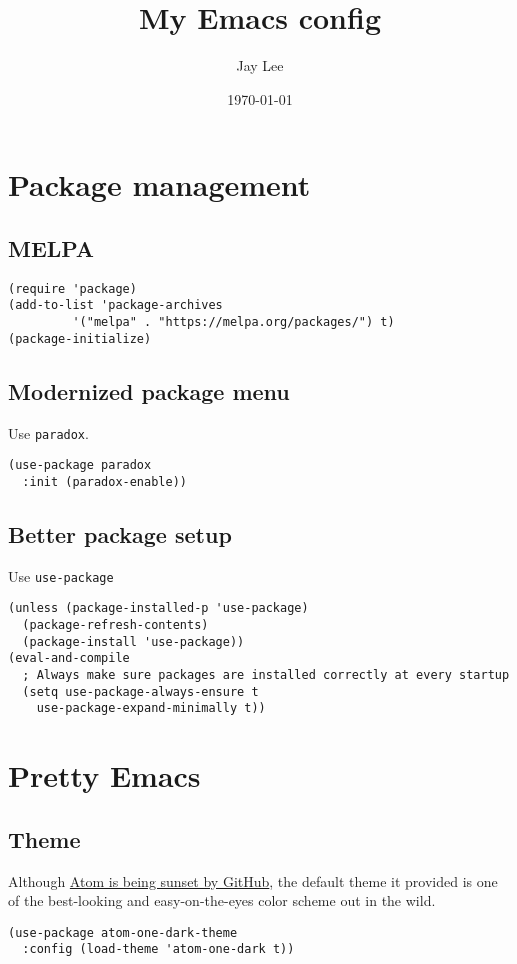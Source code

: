 \documentclass[11pt]{article}
\author{Jay Lee}
\date{\today}
\title{My Emacs config}
\begin{document}
\maketitle
\tableofcontents


\section{Package management}
\label{sec:orgad7addf}
\subsection{MELPA}
\label{sec:orgdc9a97b}
\begin{verbatim}
(require 'package)
(add-to-list 'package-archives
	     '("melpa" . "https://melpa.org/packages/") t)
(package-initialize)
\end{verbatim}

\subsection{Modernized package menu}
\label{sec:orge43d1d0}
Use \texttt{paradox}.
\begin{verbatim}
(use-package paradox
  :init (paradox-enable))
\end{verbatim}

\subsection{Better package setup}
\label{sec:org85f3d41}
Use \texttt{use-package}
\begin{verbatim}
(unless (package-installed-p 'use-package)
  (package-refresh-contents)
  (package-install 'use-package))
(eval-and-compile
  ; Always make sure packages are installed correctly at every startup
  (setq use-package-always-ensure t
	use-package-expand-minimally t))
\end{verbatim}

\section{Pretty Emacs}
\label{sec:orgba245d8}
\subsection{Theme}
\label{sec:org0f503fc}
Although \href{https://github.blog/2022-06-08-sunsetting-atom/}{Atom is being sunset by GitHub}, the default theme it provided is one of the best-looking and easy-on-the-eyes color scheme out in the wild.
\begin{verbatim}
(use-package atom-one-dark-theme
  :config (load-theme 'atom-one-dark t))
\end{verbatim}
\end{document}
